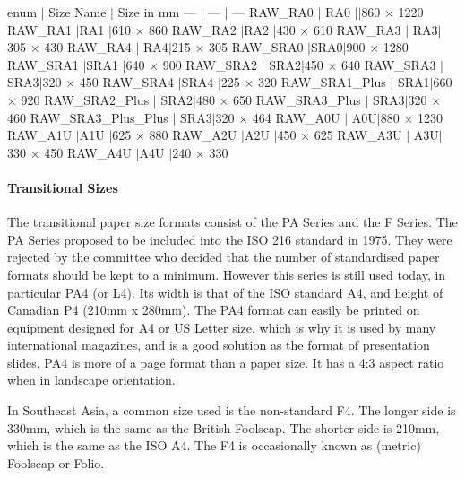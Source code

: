 enum $\vert$ Size Name $\vert$ Size in mm --- $\vert$ --- $\vert$ --- R\+A\+W\+\_\+\+R\+A0 $\vert$ R\+A0 $\vert$$\vert$860 × 1220 R\+A\+W\+\_\+\+R\+A1 $\vert$\+R\+A1 $\vert$610 × 860 R\+A\+W\+\_\+\+R\+A2 $\vert$\+R\+A2 $\vert$430 × 610 R\+A\+W\+\_\+\+R\+A3 $\vert$ R\+A3$\vert$305 × 430 R\+A\+W\+\_\+\+R\+A4 $\vert$ R\+A4$\vert$215 × 305 R\+A\+W\+\_\+\+S\+R\+A0 $\vert$\+S\+R\+A0$\vert$900 × 1280 R\+A\+W\+\_\+\+S\+R\+A1 $\vert$\+S\+R\+A1 $\vert$640 × 900 R\+A\+W\+\_\+\+S\+R\+A2 $\vert$ S\+R\+A2$\vert$450 × 640 R\+A\+W\+\_\+\+S\+R\+A3 $\vert$ S\+R\+A3$\vert$320 × 450 R\+A\+W\+\_\+\+S\+R\+A4 $\vert$\+S\+R\+A4 $\vert$225 × 320 R\+A\+W\+\_\+\+S\+R\+A1\+\_\+\+Plus $\vert$ S\+R\+A1$\vert$660 × 920 R\+A\+W\+\_\+\+S\+R\+A2\+\_\+\+Plus $\vert$ S\+R\+A2$\vert$480 × 650 R\+A\+W\+\_\+\+S\+R\+A3\+\_\+\+Plus $\vert$ S\+R\+A3$\vert$320 × 460 R\+A\+W\+\_\+\+S\+R\+A3\+\_\+\+Plus\+\_\+\+Plus $\vert$ S\+R\+A3$\vert$320 × 464 R\+A\+W\+\_\+\+A0U $\vert$ A0\+U$\vert$880 × 1230 R\+A\+W\+\_\+\+A1U $\vert$\+A1U $\vert$625 × 880 R\+A\+W\+\_\+\+A2U $\vert$\+A2U $\vert$450 × 625 R\+A\+W\+\_\+\+A3U $\vert$ A3\+U$\vert$330 × 450 R\+A\+W\+\_\+\+A4U $\vert$\+A4U $\vert$240 × 330

\paragraph*{Transitional Sizes}

The transitional paper size formats consist of the PA Series and the F Series. The PA Series proposed to be included into the I\+SO 216 standard in 1975. They were rejected by the committee who decided that the number of standardised paper formats should be kept to a minimum. However this series is still used today, in particular P\+A4 (or L4). Its width is that of the I\+SO standard A4, and height of Canadian P4 (210mm x 280mm). The P\+A4 format can easily be printed on equipment designed for A4 or US Letter size, which is why it is used by many international magazines, and is a good solution as the format of presentation slides. P\+A4 is more of a page format than a paper size. It has a 4\+:3 aspect ratio when in landscape orientation.

In Southeast Asia, a common size used is the non-\/standard F4. The longer side is 330mm, which is the same as the British Foolscap. The shorter side is 210mm, which is the same as the I\+SO A4. The F4 is occasionally known as (metric) Foolscap or Folio.

